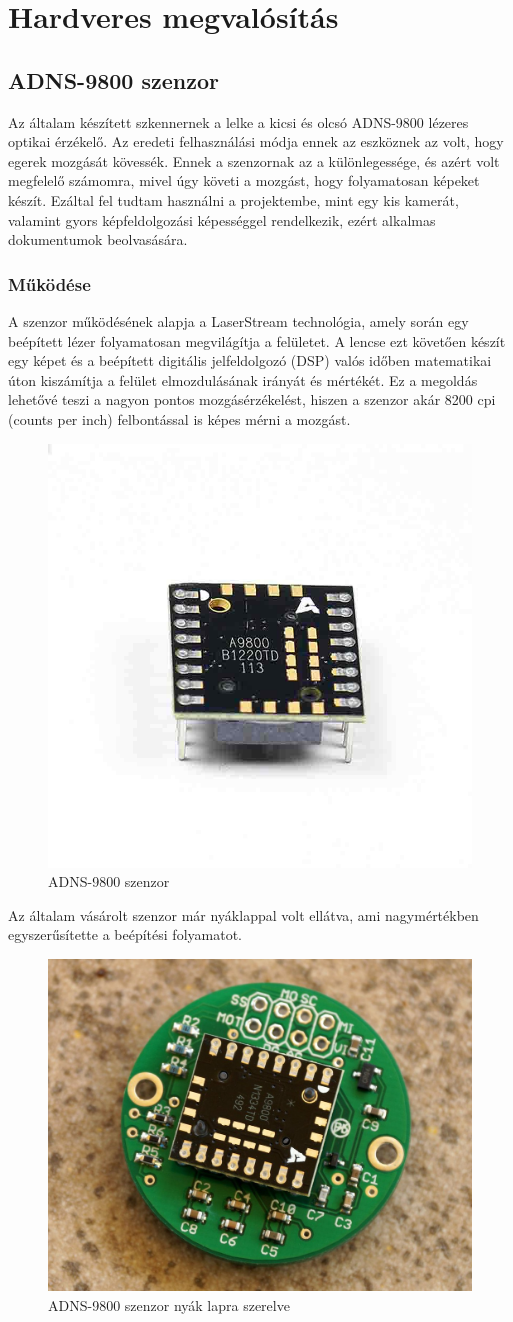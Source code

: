 \documentclass[]{thesis-ekf}
\theoremstyle{definition}
\theoremstyle{remark}
\begin{document}
	\chapter{Hardveres megvalósítás}
	\section{ADNS-9800 szenzor}
	Az általam készített szkennernek a lelke a kicsi és olcsó ADNS-9800\cite{adns9800} lézeres optikai érzékelő. Az eredeti felhasználási módja ennek az eszköznek az volt, hogy egerek mozgását kövessék. Ennek a szenzornak az a különlegessége, és azért volt megfelelő számomra, mivel úgy követi a mozgást, hogy folyamatosan képeket készít. Ezáltal fel tudtam használni a projektembe, mint egy kis kamerát, valamint gyors képfeldolgozási képességgel rendelkezik, ezért alkalmas dokumentumok beolvasására. 
	\subsection{Működése}
	A szenzor működésének alapja a LaserStream technológia, amely során egy beépített lézer folyamatosan megvilágítja a felületet. A lencse ezt követően készít egy képet és a beépített digitális jelfeldolgozó (DSP) valós időben matematikai úton kiszámítja a felület elmozdulásának irányát és mértékét. Ez a megoldás lehetővé teszi a nagyon pontos mozgásérzékelést, hiszen a szenzor akár 8200 cpi (counts per inch) felbontással is képes mérni a mozgást.
	\begin{figure}[th!]
		\centering
		\includegraphics[width=0.35\linewidth]{ADNS9800base}
		\caption[ADNS9800]{ADNS-9800 szenzor}
		\label{fig:adns9800base}
	\end{figure}
	
	Az általam vásárolt szenzor már nyáklappal volt ellátva, ami nagymértékben egyszerűsítette a beépítési folyamatot. \cite{adns9800_buy}
	
	\begin{figure}[th!]
		\centering
		\includegraphics[width=0.3\linewidth]{ADNS9800}
		\caption[ADNS9800]{ADNS-9800 szenzor nyák lapra szerelve}
		\label{fig:adns9800}
	\end{figure}
	
\end{document}
